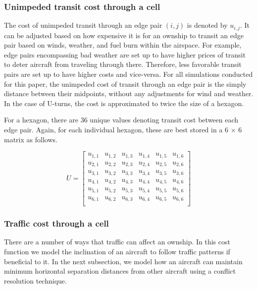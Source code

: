 \documentclass[conference, letter]{IEEEtran}
\begin{document}
\subsubsection*{Unimpeded transit cost through a cell}
The cost of unimpeded transit through an edge pair  $(i, j)$ is denoted by $u_{i, j}$. It can be adjusted based on how expensive it is for an ownship to transit an edge pair based on winds, weather, and fuel burn within the airspace. For example, edge pairs encompassing bad weather are set up to have higher prices of transit to deter aircraft from traveling through there. Therefore, less favorable transit pairs are set up to have higher costs and vice-versa. For all simulations conducted for this paper, the unimpeded cost of transit through an edge pair is the simply distance between their midpoints, without any adjustments for wind and weather. In the case of U-turns, the cost is approximated to twice the size of a hexagon. 

For a hexagon, there are 36 unique values denoting transit cost between each edge pair. Again, for each individual hexagon, these are best stored in a 6 $\times$ 6 matrix as follows. 

\begin{equation}
    \label{u_matrix}
    U = 
\begin{bmatrix}
    u_{1,1} & u_{1,2} & u_{1,3}& u_{1,4}& u_{1,5}& u_{1,6}\\
    u_{2,1} & u_{2,2} & u_{2,3}& u_{2,4}& u_{2,5}& u_{2,6}\\
    u_{3,1} & u_{3,2} & u_{3,3}& u_{3,4}& u_{3,5}& u_{3,6}\\
    u_{4,1} & u_{4,2} & u_{4,3}& u_{4,4}& u_{4,5}& u_{4,6}\\
    u_{5,1} & u_{5,2} & u_{5,3}& u_{5,4}& u_{5,5}& u_{5,6}\\
    u_{6,1} & u_{6,2} & u_{6,3}& u_{6,4}& u_{6,5}& u_{6,6}\\
\end{bmatrix}
\end{equation}
\subsubsection*{Traffic cost through a cell}

There are a number of ways that traffic can affect an ownship. In this cost function we model the inclination of an aircraft to follow traffic patterns if beneficial to it. In the next subsection, we model how an aircraft can maintain minimum horizontal separation distances from other aircraft using a conflict resolution technique. 
\end{document}

